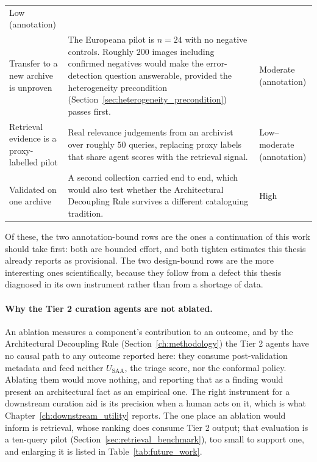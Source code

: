 \documentclass[12pt,a4paper]{report}
\begin{document}
\begin{table}[!htbp]
\begin{tabular}{p{3.9cm} p{7.3cm} p{2.2cm}}
Low (annotation) \\
\addlinespace
Transfer to a new archive is unproven &
The Europeana pilot is $n=24$ with no negative controls. Roughly $200$ images including confirmed negatives would make the error-detection question answerable, provided the heterogeneity precondition (Section~\ref{sec:heterogeneity_precondition}) passes first. &
Moderate (annotation) \\
\addlinespace
Retrieval evidence is a proxy-labelled pilot &
Real relevance judgements from an archivist over roughly $50$ queries, replacing proxy labels that share agent scores with the retrieval signal. &
Low--moderate (annotation) \\
\addlinespace
Validated on one archive &
A second collection carried end to end, which would also test whether the Architectural Decoupling Rule survives a different cataloguing tradition. &
High \\
\bottomrule
\end{tabular}
\end{table}

Of these, the two annotation-bound rows are the ones a continuation of this work should take first: both are bounded effort, and both tighten estimates this thesis already reports as provisional. The two design-bound rows are the more interesting ones scientifically, because they follow from a defect this thesis diagnosed in its own instrument rather than from a shortage of data.

\paragraph{Why the Tier 2 curation agents are not ablated.} An ablation measures a component's contribution to an outcome, and by the Architectural Decoupling Rule (Section~\ref{ch:methodology}) the Tier 2 agents have no causal path to any outcome reported here: they consume post-validation metadata and feed neither $U_{\text{SAA}}$, the triage score, nor the conformal policy. Ablating them would move nothing, and reporting that as a finding would present an architectural fact as an empirical one. The right instrument for a downstream curation aid is its precision when a human acts on it, which is what Chapter~\ref{ch:downstream_utility} reports. The one place an ablation would inform is retrieval, whose ranking does consume Tier 2 output; that evaluation is a ten-query pilot (Section~\ref{sec:retrieval_benchmark}), too small to support one, and enlarging it is listed in Table~\ref{tab:future_work}.
\end{document}
